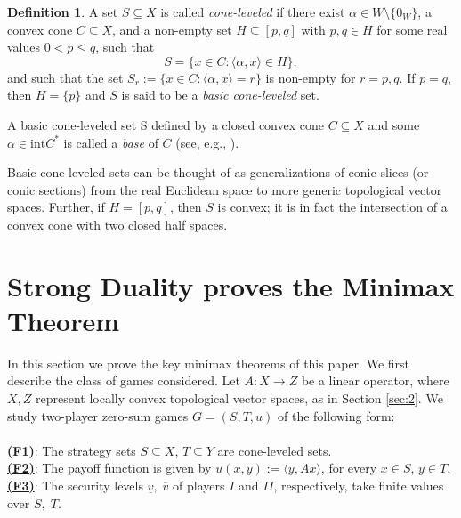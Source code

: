 \documentclass[11pt, twoside]{article}
\numberwithin{equation}{section}
\theoremstyle{definition}
\newtheorem{definition}{Definition}[section]
\begin{document}
\begin{definition}\label{def:2.2}
A set $S\subseteq X$ is called \textit{cone-leveled} if there exist $\alpha\in W\setminus\{0_W\}$, a convex cone $C\subseteq X$, and a non-empty set $H\subseteq [p,q]$ with $p,q\in H$ for some real values $0<p\leq q$, such that 
\begin{equation}\label{eq:2.7}
    S=\bigl\{x\in C:\langle \alpha,x\rangle\in H\bigr\},
\end{equation}
and such that the set $S_r:=  \bigl\{x\in C:\langle \alpha,x\rangle =r\bigr\}$ is non-empty for $r=p,q$.  If $p=q$, then $H=\{p\}$ and $S$ is said to be a \textit{basic cone-leveled} set.
\end{definition}
A basic cone-leveled set S defined by a closed convex cone $C\subseteq X$ and some $\alpha\in \text{int}C^*$ is called a \textit{base} of $C$ (see, e.g., \cite{casini2010cones}).\par

Basic cone-leveled sets can be thought of as generalizations of conic slices (or conic sections) from the real Euclidean space to more generic topological vector spaces. Further, if $H=[p,q]$, then $S$ is convex; it is in fact the intersection of a convex cone with two closed half spaces.


\vspace{-0.1cm}\section{Strong Duality proves the Minimax Theorem}\label{sec:3}\vspace{-0.2cm}

In this section we prove the key minimax theorems of this paper. We first describe the class of games considered. Let $A:X\rightarrow Z$ be a linear operator, where $X,Z$ represent locally convex topological vector spaces, as in Section \ref{sec:2}. We study two-player zero-sum games $G=(S,T,u)$ of the following form:\hypertarget{f1}{}\hypertarget{f2}{}\hypertarget{f3}{} \\ \\
\textbf{\hyperlink{f1}{(F1)}}: The strategy sets $S\subseteq X$, $T\subseteq Y$ are cone-leveled sets.\vspace{0.1cm} \\ 
\textbf{\hyperlink{f2}{(F2)}}: The payoff function is given by $u(x,y):= \langle y,Ax\rangle$, for every $x\in S$, $y\in T$.\vspace{0.1cm} \\
\textbf{\hyperlink{f3}{(F3)}}: The security levels $\underline{v},\;\overline{v}$ of players $I$ and $II$, respectively, take finite values over $S,\;T$.\vspace{0.2cm}
\end{document}
